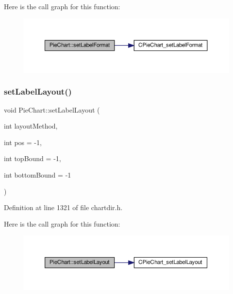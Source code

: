 Here is the call graph for this function\+:
\nopagebreak
\begin{figure}[H]
\begin{center}
\leavevmode
\includegraphics[width=350pt]{class_pie_chart_adc0379ce4654443993084784745bf3ad_cgraph}
\end{center}
\end{figure}
\mbox{\label{class_pie_chart_a3ddab403bbb5211e5af0aa9b9118b126}} 
\subsubsection{\texorpdfstring{set\+Label\+Layout()}{setLabelLayout()}}
{\footnotesize\ttfamily void Pie\+Chart\+::set\+Label\+Layout (\begin{DoxyParamCaption}\item[{int}]{layout\+Method,  }\item[{int}]{pos = {\ttfamily -\/1},  }\item[{int}]{top\+Bound = {\ttfamily -\/1},  }\item[{int}]{bottom\+Bound = {\ttfamily -\/1} }\end{DoxyParamCaption})\hspace{0.3cm}{\ttfamily [inline]}}



Definition at line 1321 of file chartdir.\+h.

Here is the call graph for this function\+:
\nopagebreak
\begin{figure}[H]
\begin{center}
\leavevmode
\includegraphics[width=350pt]{class_pie_chart_a3ddab403bbb5211e5af0aa9b9118b126_cgraph}
\end{center}
\end{figure}
\mbox{\label{class_pie_chart_ac4b3730538d6f8dffea410599d1bae20}} 
